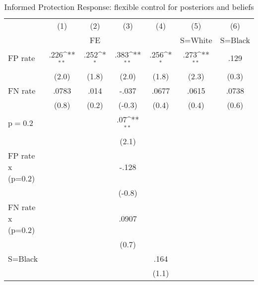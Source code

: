 \begin{table}[htbp]\centering
\def\sym#1{\ifmmode^{#1}\else\(^{#1}\)\fi}
\caption{Informed Protection Response: flexible control for posteriors and beliefs}
\begin{tabular}{l*{6}{c}}
\hline\hline
                &\multicolumn{1}{c}{(1)}&\multicolumn{1}{c}{(2)}&\multicolumn{1}{c}{(3)}&\multicolumn{1}{c}{(4)}&\multicolumn{1}{c}{(5)}&\multicolumn{1}{c}{(6)}\\
                &\multicolumn{1}{c}{}&\multicolumn{1}{c}{FE}&\multicolumn{1}{c}{}&\multicolumn{1}{c}{}&\multicolumn{1}{c}{S=White}&\multicolumn{1}{c}{S=Black}\\
\hline
FP rate         &     .226\sym{**} &     .252\sym{*}  &     .383\sym{**} &     .256\sym{*}  &     .273\sym{**} &     .129         \\
                &    (2.0)         &    (1.8)         &    (2.0)         &    (1.8)         &    (2.3)         &    (0.3)         \\
FN rate         &    .0783         &     .014         &    -.037         &    .0677         &    .0615         &    .0738         \\
                &    (0.8)         &    (0.2)         &   (-0.3)         &    (0.4)         &    (0.4)         &    (0.6)         \\
p$=$0.2         &                  &                  &      .07\sym{**} &                  &                  &                  \\
                &                  &                  &    (2.1)         &                  &                  &                  \\
FP rate x (p=0.2)&                  &                  &    -.128         &                  &                  &                  \\
                &                  &                  &   (-0.8)         &                  &                  &                  \\
FN rate x (p=0.2)&                  &                  &    .0907         &                  &                  &                  \\
                &                  &                  &    (0.7)         &                  &                  &                  \\
S=Black         &                  &                  &                  &     .164         &                  &                  \\
                &                  &                  &                  &    (1.1)         &                  &                  \\

\end{tabular}
\end{table}
